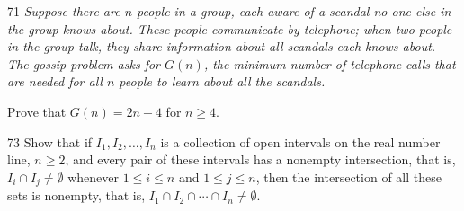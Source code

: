 \documentclass[11pt]{article}
\begin{document}
\begin{exercise}{71}
    \textit{Suppose there are $n$ people in a group, each aware of a
    scandal no one else in the group knows about. These people
    communicate by telephone; when two people in the group talk, they
    share information about all scandals each knows about. The
    gossip problem asks for $G(n)$, the minimum number of telephone
    calls that are needed for all $n$ people to learn about all the
    scandals.}

    Prove that $G(n) = 2n - 4$ for $n \geq 4$.
\end{exercise}

\begin{exercise}{73}
    Show that if $I_1, I_2, \dots, I_n$ is a collection of open
    intervals on the real number line, $n \geq 2$, and every pair of
    these intervals has a nonempty intersection, that is,
    $I_i \cap I_j \neq \emptyset$ whenever $1 \leq i \leq n$ and
    $1 \leq j \leq n$, then the intersection of all these sets is
    nonempty, that is, $I_1 \cap I_2 \cap \cdots \cap I_n \neq
    \emptyset$.
\end{exercise}
\end{document}

